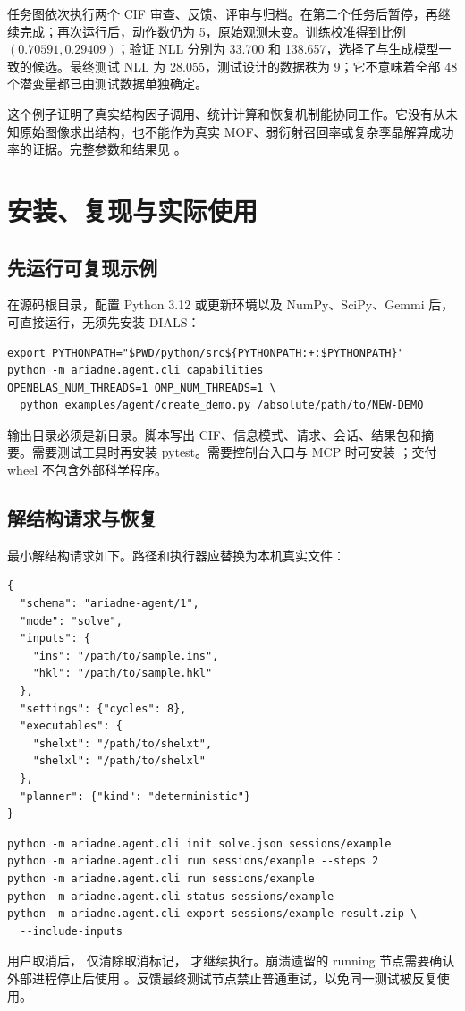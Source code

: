 \documentclass[UTF8,11pt,a4paper,fontset=fandol]{ctexart}
\newcommand{\code}[1]{\texttt{\detokenize{#1}}}
\begin{document}
任务图依次执行两个 CIF 审查、反馈、评审与归档。在第二个任务后暂停，再继续完成；再次运行后，动作数仍为 5，原始观测未变。训练校准得到比例 $(0.70591,0.29409)$；验证 NLL 分别为 33.700 和 138.657，选择了与生成模型一致的候选。最终测试 NLL 为 28.055，测试设计的数据秩为 9；它不意味着全部 48 个潜变量都已由测试数据单独确定。

这个例子证明了真实结构因子调用、统计计算和恢复机制能协同工作。它没有从未知原始图像求出结构，也不能作为真实 MOF、弱衍射召回率或复杂孪晶解算成功率的证据。完整参数和结果见 。

\section{安装、复现与实际使用}
\subsection{先运行可复现示例}

在源码根目录，配置 Python 3.12 或更新环境以及 NumPy、SciPy、Gemmi 后，可直接运行，无须先安装 DIALS：
\begin{lstlisting}
export PYTHONPATH="$PWD/python/src${PYTHONPATH:+:$PYTHONPATH}"
python -m ariadne.agent.cli capabilities
OPENBLAS_NUM_THREADS=1 OMP_NUM_THREADS=1 \
  python examples/agent/create_demo.py /absolute/path/to/NEW-DEMO
\end{lstlisting}
输出目录必须是新目录。脚本写出 CIF、信息模式、请求、会话、结果包和摘要。需要测试工具时再安装 pytest。需要控制台入口与 MCP 时可安装 \code{./python}；交付 wheel 不包含外部科学程序。

\subsection{解结构请求与恢复}

最小解结构请求如下。路径和执行器应替换为本机真实文件：
\begin{lstlisting}
{
  "schema": "ariadne-agent/1",
  "mode": "solve",
  "inputs": {
    "ins": "/path/to/sample.ins",
    "hkl": "/path/to/sample.hkl"
  },
  "settings": {"cycles": 8},
  "executables": {
    "shelxt": "/path/to/shelxt",
    "shelxl": "/path/to/shelxl"
  },
  "planner": {"kind": "deterministic"}
}
\end{lstlisting}
\begin{lstlisting}
python -m ariadne.agent.cli init solve.json sessions/example
python -m ariadne.agent.cli run sessions/example --steps 2
python -m ariadne.agent.cli run sessions/example
python -m ariadne.agent.cli status sessions/example
python -m ariadne.agent.cli export sessions/example result.zip \
  --include-inputs
\end{lstlisting}
用户取消后，\code{resume} 仅清除取消标记，\code{run} 才继续执行。崩溃遗留的 running 节点需要确认外部进程停止后使用 \code{recover}。反馈最终测试节点禁止普通重试，以免同一测试被反复使用。
\end{document}
